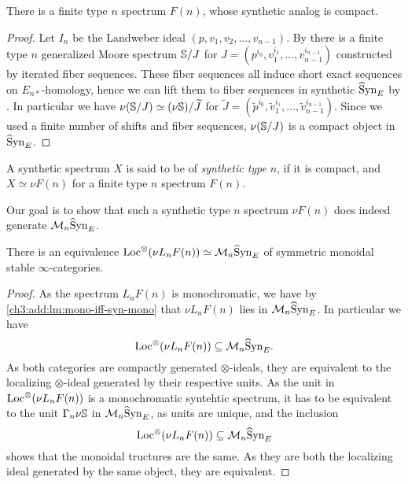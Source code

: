 \begin{lemma}
    There is a finite type $n$ spectrum $F(n)$, whose synthetic analog is compact. 
\end{lemma}
\begin{proof}
    Let $I_n$ be the Landweber ideal $(p,v_1, v_2, \ldots, v_{n-1})$. By \cite[4.14]{hovey-strickland_99} there is a finite type $n$ generalized Moore spectrum $\S/J$ for $J=(p^{i_0}, v_1^{i_1}, \ldots, v_{n-1}^{i_{n-1}})$ constructed by iterated fiber sequences. These fiber sequences all induce short exact sequences on $E_{n*}$-homology, hence we can lift them to fiber sequences in synthetic $\hSynE$ by \cite[4.23]{pstragowski_2022}. In particular we have $\nu (\S/J) \simeq (\nu \S)/\widetilde{J}$ for $\widetilde{J} = (\widetilde{p}^{i_0}, \widetilde{v}_1^{i_1}, \ldots, \widetilde{v}_{n-1}^{i_{n-1}})$. Since we used a finite number of shifts and fiber sequences, $\nu (\S/J)$ is a compact object in $\hSynE$. 
\end{proof}

\begin{definition}
    A synthetic spectrum $X$ is said to be of \emph{synthetic type} $n$, if it is compact, and $X\simeq \nu F(n)$ for a finite type $n$ spectrum $F(n)$. 
\end{definition}

Our goal is to show that such a synthetic type $n$ spectrum $\nu F(n)$ does indeed generate $\Mn \hSynE$.

\begin{lemma}
    \label{ch3:add:monochromatic-synthetic-is-gen-by-type-n}
    There is an equivalence $\Loc^\otimes(\nu L_n F(n))\simeq \Mn\hSynE$ of symmetric monoidal stable $\infty$-categories. 
\end{lemma}
\begin{proof}
    As the spectrum $L_n F(n)$ is monochromatic, we have by \cref{ch3:add:lm:mono-iff-syn-mono} that $\nu L_n F(n)$ lies in $\Mn\hSynE$. In particular we have 
    \[\Loc^{\otimes}(\nu L_n F(n))\subseteq \Mn\hSynE.\]
    As both categories are compactly generated $\otimes$-ideals, they are equivalent to the localizing $\otimes$-ideal generated by their respective units. As the unit in $\Loc^\otimes(\nu L_n F(n))$ is a monochromatic syntehtic spectrum, it has to be equivalent to the unit $\Gamma_n \nu \S$ in $\Mn\hSynE$, as units are unique, and the inclusion
    \[\Loc^{\otimes}(\nu L_n F(n))\subseteq \Mn\hSynE\] shows that the monoidal tructures are the same. As they are both the localizing ideal generated by the same object, they are equivalent. 
\end{proof}








